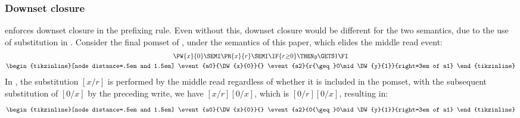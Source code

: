 \subsubsection*{Downset closure}

\jjr{} enforces downset closure in the prefixing rule.  Even without this,
downset closure would be different for the two semantics, due to the use of
substitution in \jjr{}.  Consider the final pomset of ,
under the semantics of this paper, which elides the middle read event:
\begin{align*}
  \begin{gathered}[t]
    \PW{x}{0} 
    \SEMI\PR{x}{r} 
    \SEMI\IF{r{\geq}0}\THEN y\GETS1 \FI
    \\
    \hbox{\begin{tikzinline}[node distance=.5em and 1.5em]
        \event{a0}{\DW{x}{0}}{}
        \event{a2}{r{\geq}0\mid\DW{y}{1}}{right=3em of a1}      
      \end{tikzinline}}    
  \end{gathered}
\end{align*}
In \jjr{}, the substitution $[x/r]$ is performed by the middle read
regardless of whether it is included in the pomset, with the subsequent
substitution of $[0/x]$ by the preceding write, we have $[x/r][0/x]$, which
is $[0/r][0/x]$, resulting in:
\begin{align*}
  \begin{gathered}[t]
    \hbox{\begin{tikzinline}[node distance=.5em and 1.5em]
        \event{a0}{\DW{x}{0}}{}
        \event{a2}{0{\geq}0\mid\DW{y}{1}}{right=3em of a1}      
      \end{tikzinline}}    
  \end{gathered}
\end{align*}


